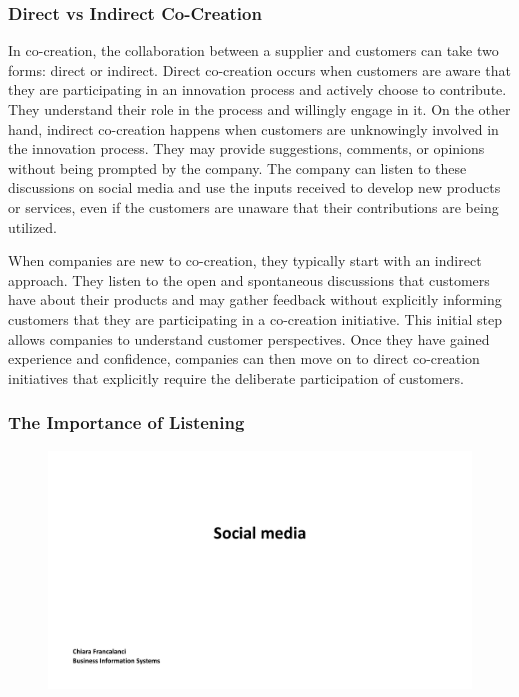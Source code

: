 \subsubsection{Direct vs Indirect
  Co-Creation}\label{direct-vs-indirect-co-creation}

In co-creation, the collaboration between a supplier and customers can
take two forms: direct or indirect. Direct co-creation occurs when
customers are aware that they are participating in an innovation process
and actively choose to contribute. They understand their role in the
process and willingly engage in it. On the other hand, indirect
co-creation happens when customers are unknowingly involved in the
innovation process. They may provide suggestions, comments, or opinions
without being prompted by the company. The company can listen to these
discussions on social media and use the inputs received to develop new
products or services, even if the customers are unaware that their
contributions are being utilized.

When companies are new to co-creation, they typically start with an
indirect approach. They listen to the open and spontaneous discussions
that customers have about their products and may gather feedback without
explicitly informing customers that they are participating in a
co-creation initiative. This initial step allows companies to understand
customer perspectives. Once they have gained experience and confidence,
companies can then move on to direct co-creation initiatives that
explicitly require the deliberate participation of customers.

\subsubsection{The Importance of
  Listening}\label{the-importance-of-listening}

\begin{figure}[!h]
  \centering
  \includegraphics[page=12, trim = 1.5cm 7cm 2.5cm 4cm, clip, width=\imagewidth]{images/04 - Social_Media.pdf}
\end{figure}

